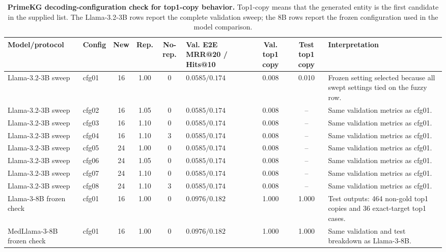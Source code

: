 \documentclass[11pt]{article}
\makeatletter
\newcommand{\mrr}{MRR@20}
\newcommand{\hitsten}{Hits@10}
\renewcommand{\arraystretch}{1.15}
\makeatother
\begin{document}
    \begin{table}[H]
    \caption{\textbf{PrimeKG decoding-configuration check for top1-copy behavior.} Top1-copy means that the generated entity is the first candidate in the supplied list. The Llama-3.2-3B rows report the complete validation sweep; the 8B rows report the frozen configuration used in the model comparison.}
    \label{tab:s9_primekg_config_audit}
    \footnotesize
    \setlength{\tabcolsep}{3.0pt}
    \renewcommand{\arraystretch}{1.04}
    \begin{tabularx}{\textwidth}{L{0.18\textwidth} L{0.13\textwidth} c c c L{0.13\textwidth} c c Y}
    \toprule
    Model/protocol & Config & New & Rep. & No-rep. & Val. E2E \mrr{} / \hitsten{} & Val. top1 copy & Test top1 copy & Interpretation \\
    \midrule
    Llama-3.2-3B sweep & cfg01 & 16 & 1.00 & 0 & \(0.0585/0.174\) & 0.008 & 0.010 & Frozen setting selected because all swept settings tied on the fuzzy row. \\
    Llama-3.2-3B sweep & cfg02 & 16 & 1.05 & 0 & \(0.0585/0.174\) & 0.008 & -- & Same validation metrics as cfg01. \\
    Llama-3.2-3B sweep & cfg03 & 16 & 1.10 & 0 & \(0.0585/0.174\) & 0.008 & -- & Same validation metrics as cfg01. \\
    Llama-3.2-3B sweep & cfg04 & 16 & 1.10 & 3 & \(0.0585/0.174\) & 0.008 & -- & Same validation metrics as cfg01. \\
    Llama-3.2-3B sweep & cfg05 & 24 & 1.00 & 0 & \(0.0585/0.174\) & 0.008 & -- & Same validation metrics as cfg01. \\
    Llama-3.2-3B sweep & cfg06 & 24 & 1.05 & 0 & \(0.0585/0.174\) & 0.008 & -- & Same validation metrics as cfg01. \\
    Llama-3.2-3B sweep & cfg07 & 24 & 1.10 & 0 & \(0.0585/0.174\) & 0.008 & -- & Same validation metrics as cfg01. \\
    Llama-3.2-3B sweep & cfg08 & 24 & 1.10 & 3 & \(0.0585/0.174\) & 0.008 & -- & Same validation metrics as cfg01. \\
    Llama-3-8B frozen check & cfg01 & 16 & 1.00 & 0 & \(0.0976/0.182\) & 1.000 & 1.000 & Test outputs: 464 non-gold top1 copies and 36 exact-target top1 cases. \\
    MedLlama-3-8B frozen check & cfg01 & 16 & 1.00 & 0 & \(0.0976/0.182\) & 1.000 & 1.000 & Same validation and test breakdown as Llama-3-8B. \\
    \bottomrule
    \end{tabularx}
    \end{table}
    \FloatBarrier
\end{document}
